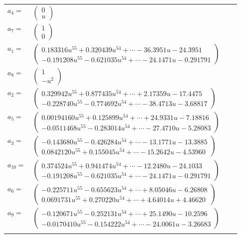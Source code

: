 \documentclass[1p]{elsarticle_modified}
\theoremstyle{definition}
\begin{document}
\begin{tabular}{m{7pt} m{180pt} m{7pt} m{180pt} }
\flushright $a_{4}=$&$\begin{pmatrix}0\\u\end{pmatrix}$ \\
\flushright $a_{7}=$&$\begin{pmatrix}1\\0\end{pmatrix}$ \\
\flushright $a_{1}=$&$\begin{pmatrix}0.183316 u^{55}+0.320439 u^{54}+\cdots-36.3951 u-24.3951\\-0.191208 u^{55}-0.621035 u^{54}+\cdots-24.1471 u-0.291791\end{pmatrix}$ \\
\flushright $a_{8}=$&$\begin{pmatrix}1\\- u^2\end{pmatrix}$ \\
\flushright $a_{2}=$&$\begin{pmatrix}0.329942 u^{55}+0.877435 u^{54}+\cdots+2.17359 u-17.4475\\-0.228740 u^{55}-0.774692 u^{54}+\cdots-38.4713 u-3.68817\end{pmatrix}$ \\
\flushright $a_{5}=$&$\begin{pmatrix}0.00194160 u^{55}+0.125899 u^{54}+\cdots+24.9331 u-7.18816\\-0.0511468 u^{55}-0.283014 u^{54}+\cdots-27.4710 u-5.28083\end{pmatrix}$ \\
\flushright $a_{3}=$&$\begin{pmatrix}-0.143680 u^{55}-0.426284 u^{54}+\cdots-13.1771 u-13.3885\\0.0842120 u^{55}+0.155045 u^{54}+\cdots-15.2642 u-4.53960\end{pmatrix}$ \\
\flushright $a_{10}=$&$\begin{pmatrix}0.374524 u^{55}+0.941474 u^{54}+\cdots-12.2480 u-24.1033\\-0.191208 u^{55}-0.621035 u^{54}+\cdots-24.1471 u-0.291791\end{pmatrix}$ \\
\flushright $a_{6}=$&$\begin{pmatrix}-0.225711 u^{55}-0.655623 u^{54}+\cdots+8.05046 u-6.26808\\0.0691731 u^{55}+0.270220 u^{54}+\cdots+4.64014 u+4.46620\end{pmatrix}$ \\
\flushright $a_{9}=$&$\begin{pmatrix}-0.120671 u^{55}-0.252131 u^{54}+\cdots+25.1490 u-10.2596\\-0.0170410 u^{55}-0.154222 u^{54}+\cdots-24.0061 u-3.26683\end{pmatrix}$\\&\end{tabular}
\end{document}
